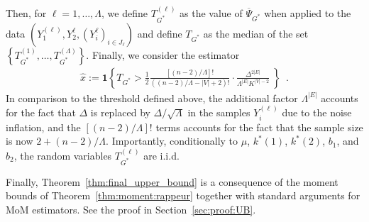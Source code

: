 \documentclass{article}
\newcommand{\ac}[1]{\left\{#1\right\}}
\begin{document}
Then, for $\ell=1,\ldots, \Lambda$, we define $T_{G^*}^{(\ell)}$ as the value of $\overline{\Psi}_{G^*}$ when applied to the data $(Y_1^{(\ell)}, Y_2^{\ell},  (Y_{i}^{\ell})_{i\in J_{\ell}})$
 and define $T_{G^*}$ as the median of the set $\ac{T^{(1)}_{G^*},\ldots,T^{(\Lambda)}_{G^*}}$. Finally, we consider the estimator 
\begin{align}\label{eq:definition:hat_x}
\hat x := \mathbf{1}\ac{T_{G^*}> \frac{1}{2} \frac{[(n-2)/\Lambda]!}{((n-2)/\Lambda-|V|+2)!} \cdot \frac{\Delta^{2|E|}}{\Lambda^{|E|} K^{|V|-2}} \ } \enspace .
\end{align}
In comparison to the threshold defined above, the additional factor $\Lambda^{|E|}$ accounts for the fact that $\Delta$ is replaced by $\Delta/\sqrt{\Lambda}$ in the samples $Y_i^{(\ell)}$ due to the noise inflation, and the $[(n-2)/\Lambda]!$ terms accounts for the fact that the sample size is now $2+ (n-2)/\Lambda$. Importantly, conditionally to $\mu$, $k^*(1)$, $k^*(2)$, $b_1$, and $b_2$, the random variables  $T^{(\ell)}_{G^*}$ are i.i.d.


Finally, Theorem~\ref{thm:final_upper_bound} is a consequence of the moment bounds of Theorem~\ref{thm:moment:rappeur} together with standard arguments for MoM estimators. See the proof in Section~\ref{sec:proof:UB}. 



\end{document}
